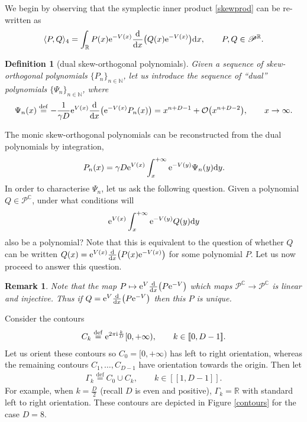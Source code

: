 \documentclass[pdftex]{sigma}
\numberwithin{equation}{section}
\newtheorem{Definition}[Theorem]{Definition}
\newtheorem{Remark}[Theorem]{Remark}
\begin{document}
We begin by observing that the symplectic inner product \eqref{skewprod} can be re-written as
\[
\langle P, Q \rangle_4 = \int_{\mathbb{R}} P(x) {\rm e}^{-V(x)} \frac{\rm d}{{\rm d}x}\big( Q(x) {\rm e}^{-V(x)} \big) {\rm d}x,\qquad P,Q \in \mathscr{P}^\mathbb{R}.
\]
\begin{Definition}[dual skew-orthogonal polynomials]
Given a sequence of skew-orthogonal polynomials $\{ P_n \}_{n \in \mathbb{N}}$, let us introduce the sequence of \enquote{dual} polynomials $\{ \Psi_n \}_{n \in \mathbb{N}}$, where
\[%
\Psi_n(x) \overset{\mathrm{def}}{=} -\frac{1}{\gamma D} {\rm e}^{V(x)}\frac{\rm d}{{\rm d}x}\big( {\rm e}^{-V(x)} P_n(x) \big) = x^{n+D-1} + \mathcal{O}\big(x^{n+D-2}\big),\qquad x \to \infty.
\]
\end{Definition}
The monic skew-orthogonal polynomials can be reconstructed from the dual polynomials by integration,
\[
P_n(x) = \gamma D {\rm e}^{V(x)} \int_{x}^{+\infty} {\rm e}^{-V(y)} \Psi_n(y) {\rm d}y.
\]
In order to characterise $\Psi_n$, let us ask the following question. Given a polynomial $Q \in \mathscr{P}^\mathbb{C}$, under what conditions will
\begin{equation*}
{\rm e}^{V(x)} \int_{x}^{+\infty} {\rm e}^{-V(y)} Q(y) {\rm d}y
\end{equation*}
also be a polynomial? Note that this is equivalent to the question of whether $Q$ can be written $Q(x) = {\rm e}^{V(x)} \frac{\rm d}{{\rm d}x} \big( P(x) {\rm e}^{-V(x)} \big)$ for some polynomial $P$. Let us now proceed to answer this question.

\begin{Remark}\label{polyunique} Note that the map $P \mapsto {\rm e}^V \frac{\rm d}{{\rm d}x}\big(P {\rm e}^{-V}\big)$ which maps $\mathscr{P}^\mathbb{C}\to \mathscr{P}^\mathbb{C}$ is linear and injective. Thus if $Q = {\rm e}^V \frac{\rm d}{{\rm d}x}\big(P {\rm e}^{-V}\big)$ then this $P$ is unique.
\end{Remark}

Consider the contours
\begin{align}\label{contour1}
C_k \overset{\mathrm{def}}{=} {\rm e}^{2\pi {\rm i}\frac{k}{D}} [0,+\infty),\qquad k \in [\![ 0,D-1]\!].
\end{align}
Let us orient these contours so $C_0=[0,+\infty)$ has left to right orientation, whereas the remaining contours $C_1, \dots, C_{D-1}$ have orientation towards the origin. Then let
\begin{align}\label{contour2}
\Gamma_k \overset{\mathrm{def}}{=} C_0 \cup C_k,\qquad k \in [\![ 1,D-1]\!].
\end{align}
For example, when $k=\frac{D}{2}$ (recall $D$ is even and positive), $\Gamma_k = \mathbb{R}$ with standard left to right orientation. These contours are depicted in Figure \ref{contours} for the case $D=8$.
\end{document}
